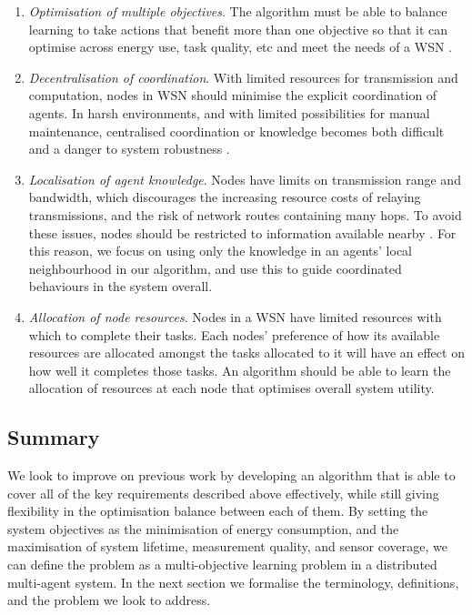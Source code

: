 \begin{enumerate}
	\item \textit{Optimisation of multiple objectives}.  The algorithm must be able to balance learning to take actions that benefit more than one objective so that it can optimise across energy use, task quality, etc and meet the needs of a WSN \citep{Guo2019, s150717572, SENGUPTA2013405}.

	\item \textit{Decentralisation of coordination}. With limited resources for transmission and computation, nodes in WSN should minimise the explicit coordination of agents.  In harsh environments, and with limited possibilities for manual maintenance, centralised coordination or knowledge becomes both difficult and a danger to system robustness \cite{XXX}.
	
	\item \textit{Localisation of agent knowledge}. Nodes have limits on transmission range and bandwidth, which discourages the increasing resource costs of relaying transmissions, and the risk of network routes containing many hops. To avoid these issues, nodes should be restricted to information available nearby \citep{10.1007/978-3-642-11814-2_4}. For this reason, we focus on using only the knowledge in an agents' local neighbourhood in our algorithm, and use this to guide coordinated behaviours in the system overall.
	
	\item \textit{Allocation of node resources}. Nodes in a WSN have limited resources with which to complete their tasks. Each nodes' preference of how its available resources are allocated amongst the tasks allocated to it will have an effect on how well it completes those tasks. An algorithm should be able to learn the allocation of resources at each node that optimises overall system utility. 
\end{enumerate}

\subsection{Summary}
We look to improve on previous work by developing an algorithm that is able to cover all of the key requirements described above effectively, while still giving flexibility in the optimisation balance between each of them. By setting the system objectives as the minimisation of energy consumption, and the maximisation of system lifetime, measurement quality, and sensor coverage, we can define the problem as a multi-objective learning problem in a distributed multi-agent system. In the next section we formalise the terminology, definitions, and the problem we look to address.


